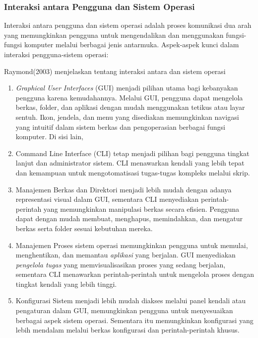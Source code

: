 \documentclass[12pt]{article}
\begin{document}
\subsubsection{Interaksi antara Pengguna dan Sistem Operasi}

Interaksi antara pengguna dan sistem operasi adalah proses komunikasi dua arah yang memungkinkan pengguna untuk mengendalikan dan menggunakan fungsi-fungsi komputer melalui berbagai jenis antarmuka. Aspek-aspek kunci dalam interaksi pengguna-sistem operasi:

Raymond(2003) menjelaskan tentang interaksi antara dan sistem operasi

\begin{enumerate}
\item \textit{Graphical User Interfaces } (GUI) menjadi pilihan utama bagi kebanyakan pengguna karena kemudahannya. Melalui GUI, pengguna dapat mengelola berkas, folder, dan aplikasi dengan mudah menggunakan tetikus atau layar sentuh. Ikon, jendela, dan menu yang disediakan memungkinkan navigasi yang intuitif dalam sistem berkas dan pengoperasian berbagai fungsi komputer. Di sisi lain, \item{Command Line Interface (CLI)} tetap menjadi pilihan bagi pengguna tingkat lanjut dan administrator sistem. CLI menawarkan kendali yang lebih tepat dan kemampuan untuk mengotomatisasi tugas-tugas kompleks melalui skrip.

\item {Manajemen Berkas dan Direktori} menjadi lebih mudah dengan adanya representasi visual dalam GUI, sementara CLI menyediakan perintah-perintah yang memungkinkan manipulasi berkas secara efisien. Pengguna dapat dengan mudah membuat, menghapus, memindahkan, dan mengatur berkas serta folder sesuai kebutuhan mereka.

\item {Manajemen Proses} sistem operasi memungkinkan pengguna untuk memulai, menghentikan, dan memantau\textit{ aplikasi} yang berjalan. GUI menyediakan \textit{pengelola tugas} yang memvisualisasikan proses yang sedang berjalan, sementara CLI menawarkan perintah-perintah untuk mengelola proses dengan tingkat kendali yang lebih tinggi.

\item {Konfigurasi Sistem} menjadi lebih mudah diakses melalui panel kendali atau pengaturan dalam GUI, memungkinkan pengguna untuk menyesuaikan berbagai aspek sistem operasi. Sementara itu memungkinkan konfigurasi yang lebih mendalam melalui berkas konfigurasi dan perintah-perintah khusus.


\end{enumerate}
\end{document}
